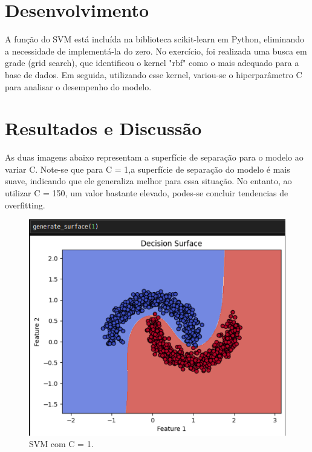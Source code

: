 \documentclass{article} %
\begin{document}
\vspace{1cm}

\section{Desenvolvimento}

\vspace{1cm}

A função do SVM está incluída na biblioteca scikit-learn em Python, eliminando a necessidade de implementá-la do zero. No exercício, foi realizada uma busca em grade (grid search), que identificou o kernel "rbf" como o mais adequado para a base de dados. Em seguida, utilizando esse kernel, variou-se o hiperparâmetro C para analisar o desempenho do modelo.

\vspace{1cm}

\section{Resultados e Discussão}

\vspace{1cm}

As duas imagens abaixo representam a superfície de separação para o modelo ao variar C. Note-se que para C = 1,a superfície de separação do modelo é mais suave, indicando que ele generaliza melhor para essa situação. No entanto, ao utilizar C = 150, um valor bastante elevado, podes-se concluir tendencias de overfitting.

\vspace{1cm}

\begin{figure}[h] %
    \centering %
    \includegraphics[width=0.5\linewidth]{svm_c_1.png} %
    \caption{SVM com C = 1.} %
    \label{fig:exemplo} %
\end{figure}
\end{document}

